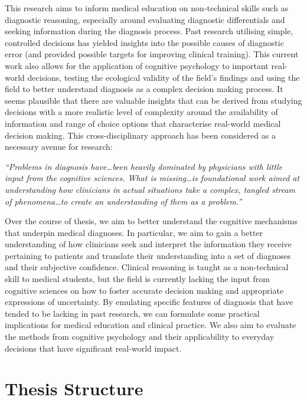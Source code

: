 \documentclass[a4paper, nobind]{templates/ociamthesis}
\begin{document}
\hfill\break
This research aims to inform medical education on non-technical skills such as diagnostic reasoning, especially around evaluating diagnostic differentials and seeking information during the diagnosis process. Past research utilising simple, controlled decisions has yielded insights into the possible causes of diagnostic error (and provided possible targets for improving clinical training). This current work also allows for the application of cognitive psychology to important real-world decisions, testing the ecological validity of the field's findings and using the field to better understand diagnosis as a complex decision making process. It seems plausible that there are valuable insights that can be derived from studying decisions with a more realistic level of complexity around the availability of information and range of choice options that characterise real-world medical decision making. This cross-disciplinary approach has been considered as a necessary avenue for research:

\hfill\break
\emph{``Problems in diagnosis have\ldots been heavily dominated by physicians with little input from the cognitive sciences. What is missing\ldots is foundational work aimed at understanding how clinicians in actual situations take a complex, tangled stream of phenomena\ldots to create an understanding of them as a problem.''} \autocite{wears_diagnosing_2014}

\hfill\break
Over the course of thesis, we aim to better understand the cognitive mechanisms that underpin medical diagnoses. In particular, we aim to gain a better understanding of how clinicians seek and interpret the information they receive pertaining to patients and translate their understanding into a set of diagnoses and their subjective confidence. Clinical reasoning is taught as a non-technical skill to medical students, but the field is currently lacking the input from cognitive sciences on how to foster accurate decision making and appropriate expressions of uncertainty. By emulating specific features of diagnosis that have tended to be lacking in past research, we can formulate some practical implications for medical education and clinical practice. We also aim to evaluate the methods from cognitive psychology and their applicability to everyday decisions that have significant real-world impact.

\newpage

\section{Thesis Structure}\label{thesis-structure}
\end{document}
